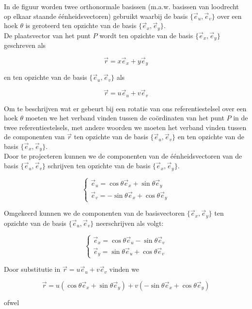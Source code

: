 In de figuur worden twee orthonormale basissen (m.a.w. basissen van loodrecht op elkaar staande \'{e}\'{e}nheidsvectoren) gebruikt waarbij de basis $\{\vec{e}_u ,\vec{e}_v \}$ over een hoek $\theta$ is geroteerd ten opzichte van de basis $\{\vec{e}_x ,\vec{e}_y \}$. \\  De plaatsvector van het punt $P$ wordt ten opzichte van de basis $\{\vec{e}_x ,\vec{e}_y \}$ geschreven als

\[  \vec{r}=x \vec{e}_x + y \vec{e}_y \] 

en ten opzichte van de basis $\{\vec{e}_u ,\vec{e}_v \}$ als 

\[  \vec{r}=u \vec{e}_u + v \vec{e}_v \] 

Om te beschrijven wat er gebeurt bij een rotatie van ons referentiestelsel over een hoek $\theta$ moeten we het verband vinden tussen de co\"{o}rdinaten van het punt $P$ in de twee referentiestelsels, met andere woorden we moeten het verband vinden tussen de componenten van $\vec{r}$ ten opzichte van de basis $\{\vec{e}_u ,\vec{e}_v \}$ en ten opzichte van de basis $\{\vec{e}_x ,\vec{e}_y \}$.\\ 

Door te projecteren kunnen we de componenten van de \'{e}\'{e}nheidsvectoren van de basis $\{\vec{e}_u ,\vec{e}_v \}$ schrijven ten opzichte van de basis $\{\vec{e}_x ,\vec{e}_y \}$.

\[  
\left \{ \begin{array}{l} 
\vec{e}_u =\cos \theta \vec{e}_x + \sin \theta \vec{e}_y \\
\vec{e}_v =-\sin \theta \vec{e}_x + \cos \theta \vec{e}_y
\end{array}  \right.
\]

Omgekeerd kunnen we de componenten van de basisvectoren $\{\vec{e}_x ,\vec{e}_y \}$ ten opzichte van de basis $\{\vec{e}_u ,\vec{e}_v \}$ neerschrijven als volgt:

\[  
\left \{ \begin{array}{l} 
\vec{e}_x =\cos \theta \vec{e}_u - \sin \theta \vec{e}_v \\
\vec{e}_y =\sin \theta \vec{e}_u + \cos \theta \vec{e}_v
\end{array}  \right.
\]

Door substitutie in $\vec{r}=u \vec{e}_u + v \vec{e}_v$ vinden we

\[ \vec{r}=u(\cos \theta \vec{e}_x + \sin \theta \vec{e}_y) + v(-\sin \theta \vec{e}_x + \cos \theta \vec{e}_y)  \]

ofwel

